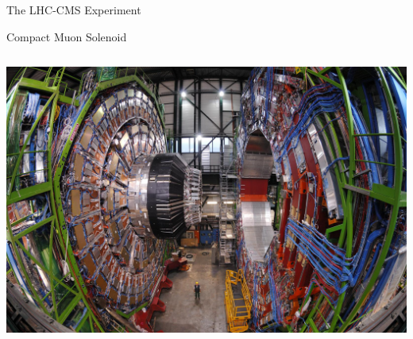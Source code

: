 \documentclass[8pt]{beamer}
\begin{document}
\begin{frame}{The LHC-CMS Experiment}
\begin{block}{Compact Muon Solenoid}
\begin{columns}
      \column[t]{4.5cm}
      \begin{center}
        \includegraphics[width=1.00\textwidth]{img/CMSOpen.jpg} 
      \end{center}

    \end{columns}

  \end{block}

\end{frame}
\end{document}
